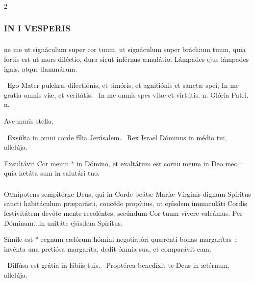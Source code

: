 \documentclass[9pt,twoside]{extarticle}
\begin{document}
\begin{multicols}{2}

{\small {}}

\subsubsection*{\center \normalfont \textsc{IN I VESPERIS}}

\subsubsection*{\normalfont {}}
ne me ut signáculum super cor tuum, ut signáculum super bráchium tuum, quia fortis est ut mors diléctio, dura sicut inférnus æmulátio. Lámpades ejus lámpades ignis, atque flammárum.

\smallskip
{}~Ego Mater pulchræ dilectiónis, et timóris, et agnitiónis et sanctæ spei; \textred{*} In me grátia omnis viæ, et veritátis. ~In me omnis spes vitæ et virtútis. n. Glória Patri. n.

{\small {} Ave maris stella. }

~Exsúlta in omni corde fília Jerúsalem. ~Rex Israel Dóminus in médio tui, allelúja.

 Exsultávit Cor meum * in Dómino, et exaltátum est cornu meum in Deo meo~: quia lætáta sum in salutári tuo.

\subsubsection*{\center \normalfont {}}
\lettrine{O}{m}nípotens sempitérne Deus, qui in Corde beátæ Maríæ Vírginis dignum Spíritus sancti habitáculum præparásti, concéde propítius, ut ejúsdem immaculáti Cordis festivitátem devóte mente recoléntes, secúndum Cor tuum vívere valeámus. Per Dóminum...in unitáte ejúsdem Spíritus.

\small
{} \normalsize

 Símile est * regnum cælórum hómini negotiatóri quærénti bonas margarítas~: invénta una pretiósa margaríta, dedit ómnia sua, et comparávit eam.

~Diffúsa est grátia in lábiis tuis. ~Proptérea benedíxit te Deus in ætérnum, allelúja.


\end{multicols}
\end{document}
